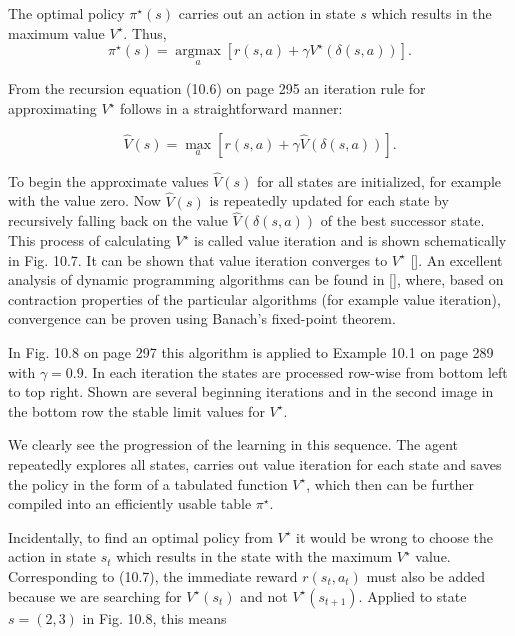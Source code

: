 \documentclass[10pt]{book}
\begin{document}
The optimal policy $\pi^{\star}(s)$ carries out an action in state $s$ which results in the maximum value $V^{\star}$. Thus,
\begin{equation*}
\pi^{\star}(s)=\underset{a}{\operatorname{argmax}}\left[r(s, a)+\gamma V^{\star}(\delta(s, a))\right] . \tag{10.7}
\end{equation*}

From the recursion equation (10.6) on page 295 an iteration rule for approximating $V^{\star}$ follows in a straightforward manner:

\begin{equation*}
\hat{V}(s)=\max _{a}[r(s, a)+\gamma \hat{V}(\delta(s, a))] . \tag{10.8}
\end{equation*}

To begin the approximate values $\hat{V}(s)$ for all states are initialized, for example with the value zero. Now $\hat{V}(s)$ is repeatedly updated for each state by recursively falling back on the value $\hat{V}(\delta(s, a))$ of the best successor state. This process of calculating $V^{\star}$ is called value iteration and is shown schematically in Fig. 10.7. It can be shown that value iteration converges to $V^{\star}$ [\cite{sutton1998rl}]. An excellent analysis of dynamic programming algorithms can be found in [\cite{szepesvari2010rlalgorithms}], where, based on contraction properties of the particular algorithms (for example value iteration), convergence can be proven using Banach's fixed-point theorem.

In Fig. 10.8 on page 297 this algorithm is applied to Example 10.1 on page 289 with $\gamma=0.9$. In each iteration the states are processed row-wise from bottom left to top right. Shown are several beginning iterations and in the second image in the bottom row the stable limit values for $V^{\star}$.

We clearly see the progression of the learning in this sequence. The agent repeatedly explores all states, carries out value iteration for each state and saves the policy in the form of a tabulated function $V^{\star}$, which then can be further compiled into an efficiently usable table $\pi^{\star}$.

Incidentally, to find an optimal policy from $V^{\star}$ it would be wrong to choose the action in state $s_{t}$ which results in the state with the maximum $V^{\star}$ value. Corresponding to (10.7), the immediate reward $r\left(s_{t}, a_{t}\right)$ must also be added because we are searching for $V^{\star}\left(s_{t}\right)$ and not $V^{\star}\left(s_{t+1}\right)$. Applied to state $s=(2,3)$ in Fig. 10.8, this means
\end{document}
